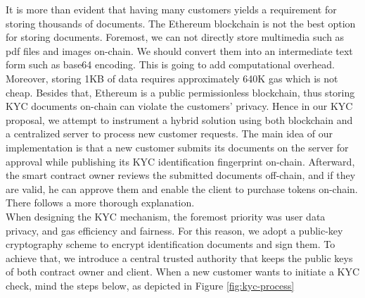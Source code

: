 \documentclass[12pt,a4paper]{article}
\begin{document}
It is more than evident that having many customers yields a requirement for
storing thousands of documents. The Ethereum blockchain is not the best option
for storing documents. Foremost, we can not directly store multimedia such as
pdf files and images on-chain. We should convert them into an intermediate text
form such as base64 encoding. This is going to add computational overhead.
Moreover, storing 1KB of data requires approximately 640K gas which is not
cheap. Besides that, Ethereum is a public permissionless blockchain, thus
storing KYC documents on-chain can violate the customers' privacy. Hence in our
KYC  proposal, we attempt to instrument a hybrid solution using both blockchain
and a centralized server to process new customer requests. The main idea of our
implementation is that a new customer submits its documents on the server for
approval while publishing its KYC identification fingerprint on-chain.
Afterward, the smart contract owner reviews the submitted documents off-chain,
and if they are valid, he can approve them and enable the client to purchase
tokens on-chain. There follows a more thorough explanation. \\


When designing the KYC mechanism, the foremost priority was user data privacy,
and gas efficiency and fairness. For this reason, we adopt a public-key
cryptography scheme to encrypt identification documents and sign them. To
achieve that, we introduce a central trusted authority that keeps the public
keys of both contract owner and client. When a new customer wants to initiate a
KYC check, mind the steps below, as depicted in Figure \ref{fig:kyc-process}
\end{document}

